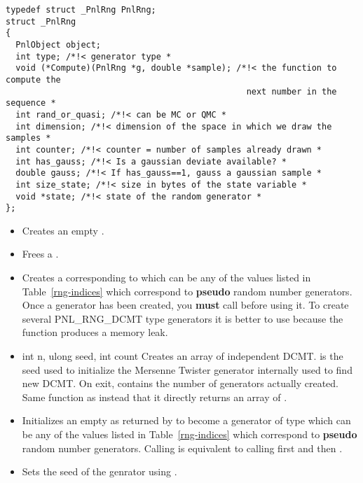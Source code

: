\begin{verbatim}
typedef struct _PnlRng PnlRng;
struct _PnlRng
{
  PnlObject object;
  int type; /*!< generator type *
  void (*Compute)(PnlRng *g, double *sample); /*!< the function to compute the
                                                next number in the sequence *
  int rand_or_quasi; /*!< can be MC or QMC *
  int dimension; /*!< dimension of the space in which we draw the samples *
  int counter; /*!< counter = number of samples already drawn *
  int has_gauss; /*!< Is a gaussian deviate available? *
  double gauss; /*!< If has_gauss==1, gauss a gaussian sample *
  int size_state; /*!< size in bytes of the state variable *
  void *state; /*!< state of the random generator *
};
\end{verbatim}


\begin{itemize}
\item {}
  \sshortdescribe Creates an empty \ptr.
\item {}
  \sshortdescribe Frees a .
\item {}
  \sshortdescribe Creates a  corresponding to 
  which can be any of the values  listed in
  Table~\ref{rng-indices} which correspond to {\bf pseudo} random number generators.
  Once a generator has been created, you {\bf must} call
   before using it. To create several PNL_RNG_DCMT type
  generators it is better to use  because the
  function  produces a memory leak.
\item {}
  {int n, ulong seed, int \ptr count}
  \sshortdescribe Creates an array of  independent DCMT.  is
  the seed used to initialize the Mersenne Twister generator internally used to
  find new DCMT. On exit,  contains the number of generators actually
  created. Same function as  instead that it
  directly returns an array of .
\item {}
  \sshortdescribe Initializes an empty  as returned by
   to become a generator of type  which can be
  any of the values  listed in Table~\ref{rng-indices} which
  correspond to {\bf pseudo} random number generators.
  Calling  is equivalent to calling first
   and then . 
\item {}
  \sshortdescribe Sets the seed of the genrator  using .
\end{itemize}


